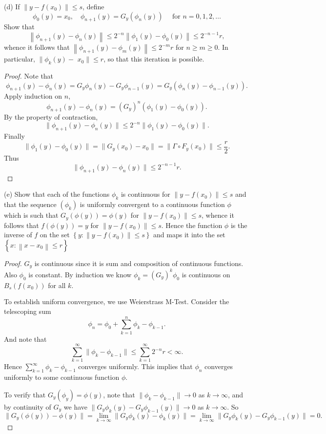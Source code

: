 \newpage
(d) If $\left\|y-f\left(x_0\right)\right\| \leq s$, define
\[
\phi_0(y)=x_0, \quad \phi_{n+1}(y)=G_y\left(\phi_n(y)\right) \quad \text { for } n=0,1,2, \ldots
\]
Show that
\[
\left\|\phi_{n+1}(y)-\phi_n(y)\right\| \leq 2^{-n}\left\|\phi_1(y)-\phi_0(y)\right\| \leq 2^{-n-1} r,
\]
whence it follows that $\left\|\phi_{n+1}(y)-\phi_m(y)\right\| \leq 2^{-m} r$ for $n \geq m \geq 0$. In particular, $\| \phi_k(y)-$ $x_0 \| \leq r$, so that this iteration is possible.
\begin{proof}
	Note that
	\[
		\phi_{n+1}(y) - \phi_n(y)=
		G_y\phi_{n}(y) - G_y\phi_{n-1}(y)=
		G_y\left(\phi_{n}(y) - \phi_{n-1}(y)\right)
	.\] 
	Apply induction on $n$,
	\[
		\phi_{n+1}(y) - \phi_n(y)=
		(G_y)^n \left(\phi_1(y) - \phi_0(y)\right)
	.\] 
	By the property of contraction,
\[
		\|\phi_{n+1}(y) - \phi_n(y)\|\le 
		2^{-n}\| \phi_1(y) - \phi_0(y)\|
	.\]
	Finally
	\[
		\|\phi_1(y) - \phi_0(y)\|=
		\|G_y(x_0) - x_0\|=
		\|\Gamma \circ F_y(x_0)\| \le  \frac{r}{2}
	.\] 
	Thus
	\[
		\|\phi_{n+1}(y) - \phi_n(y)\|\le 
		2^{-n-1}r
	.\]
\end{proof}
\newpage
(e) Show that each of the functions $\phi_k$ is continuous for $\left\|y-f\left(x_0\right)\right\| \leq s$ and that the sequence $\left(\phi_k\right)$ is uniformly convergent to a continuous function $\phi$ which is such that $G_y(\phi(y))=\phi(y)$ for $\left\|y-f\left(x_0\right)\right\| \leq s$, whence it follows that $f(\phi(y))=y$ for $\left\|y-f\left(x_0\right)\right\| \leq s$. Hence the function $\phi$ is the inverse of $f$ on the set $\left\{y:\left\|y-f\left(x_0\right)\right\| \leq s\right\}$ and maps it into the set $\left\{x:\left\|x-x_0\right\| \leq r\right\}$
\begin{proof}
	$G_y$ is continuous since it is sum and composition of continuous functions. Also $\phi_0$ is constant. By induction we know $\phi_k = \left( G_y \right) ^k \phi_0$ is continuous on $B_s(f(x_0))$ for all $k$. 

	To establish uniform convergence, we use Weierstrass M-Test. Consider the telescoping sum
	\[
		\phi_n = \phi_0 + \sum_{k = 1}^{n} \phi_k - \phi_{k - 1}
	.\] 
	And note that
	\[
		\sum_{k=1}^{\infty} \|\phi_k - \phi_{k-1}\| \le 
		\sum_{k=1}^{\infty} 2^{-n}r 
		< \infty 
	.\] 
	Hence $\sum_{k=1}^{\infty} \phi_k - \phi_{k-1}$ converges uniformly. This implies that $ \phi_n$ converges uniformly to some continuous function $\phi$.

	To verify that $G_y(\phi_y) = \phi(y)$, note that $\|\phi_k - \phi_{k-1}\| \to  0$ as $k \to  \infty $, and by continuity of $G_y$ we have $\|G_y\phi_k(y) -G_y \phi_{k-1}(y)\| \to  0$ as $k \to \infty $. So
	\[
		\|G_y(\phi(y)) - \phi(y)\| = 
		\lim_{k \to \infty} \|G_y \phi_k (y) -  \phi_{k} (y)\|=
		\lim_{k \to \infty} \|G_y \phi_k (y) - G_y \phi_{k-1} (y)\| = 0
	.\] 
\end{proof}

